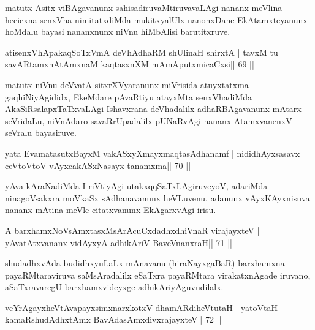 \begin{artha}
matutx Asitx viBAgavanunx sahisadiruvaMtiruvavaLAgi nananx meVlina hecicxna senxVha nimitatxdiMda mukitxyalUlx nanonxDane EkAtamxteyanunx hoMdalu bayasi nananxnunx niVnu hiMbAlisi barutitxruve.
\end{artha}

\begin{shl}
atisenxVhA\s pakaqSoTxVmA deVhAdhaRM shUlinaH shirxtA |
tavxM tu savARtamxnA\s\s tAmxnaM kaqtasxnXM mAmAputxmicaCxsi\hfill || 69 ||
\end{shl}

\begin{artha}
matutx niVnu deVvatA sitxrXVyaranunx miVrisida atuyxtatxma gaqhiNiyAgididx, EkeMdare pAvaRtiyu atayxMta senxVhadiMda AkaSiRsalapxTaTxvaLAgi Ishavxrana deVhadalilx adhaRBAgavanunx mAtarx seVridaLu, niVnAdaro savaRrUpadalilx pUNaRvAgi nananx AtamxvanenxV seVralu bayasiruve.
\end{artha}

\begin{shl}
yata EvamatasutxBayxM vakASxyXmayxmaqtasAdhanamf |
nididhAyxsasavx ceVtoV\s toV vAyxcakASxNasayx tanamxma\hfill || 70 ||
\end{shl}

\begin{artha}
yAva kAraNadiMda I riVtiyAgi utakxqqSaTxLAgiruveyoV, adariMda ninagoVsakxra moVkaSx sAdhanavanunx heVLuvenu, adanunx vAyxKAyxnisuva nananx mAtina meVle citatxvanunx EkAgarxvAgi irisu.
\end{artha}


\begin{shl}
A barxhamxNoV\s sAmxtasxMsArAcuCxdadhxdhiVnaR virajayxteV |
yAvatAtxvananx vidAyxyA adhikAriV BaveVnanxraH\hfill || 71 ||
\end{shl}

\begin{artha}
shudadhxvAda budidhxyuLaLx mAnavanu (hiraNayxgaBaR) barxhamxna payaRMtaraviruva saMsAradalilx eSaTxra payaRMtara virakatxnAgade iruvano, aSaTxravaregU barxhamxvideyxge adhikAriyAguvudilalx.
\end{artha}

\begin{shl}
veYrAgayxheVtAvapayxsimxnarxkotxV dhamARdiheVtutaH |
yatoV\s taH kamaRshudAdhxtAmx BavAdasAmxdivxrajayxteV\hfill || 72 ||
\end{shl}

